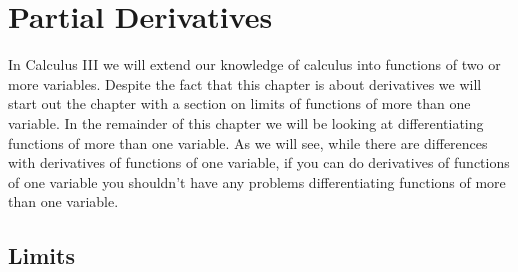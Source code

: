\documentclass[10pt,reqno]{book}
\theoremstyle{definition}
\begin{document}
	\chapter{Partial Derivatives}
	
	In Calculus III we will extend our knowledge of calculus into functions of two or more variables. Despite the fact that this chapter is about derivatives we will start out the chapter with a section on limits of functions of more than one variable. In the remainder of this chapter we will be looking at differentiating functions of more than one variable. As we will see, while there are differences with derivatives of functions of one variable, if you can do derivatives of functions of one variable you shouldn’t have any problems differentiating functions of more than one variable.
	
	\section{Limits}
	
\end{document}
